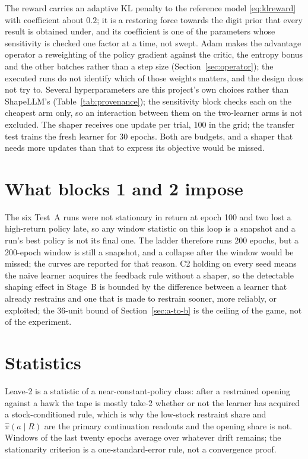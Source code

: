 The reward carries an adaptive KL penalty to the reference model
\eqref{eq:klreward} with coefficient about \(0.2\); it is a restoring
force towards the digit prior that every result is obtained under, and
its coefficient is one of the parameters whose sensitivity is checked
one factor at a time, not swept.
Adam makes the advantage operator a reweighting of the policy gradient
against the critic, the entropy bonus and the other batches rather than a
step size (Section~\ref{sec:operator}); the executed runs do not identify
which of those weights matters, and the design does not try to.
Several hyperparameters are this project's own choices rather than
ShapeLLM's (Table~\ref{tab:provenance}); the sensitivity block checks
each on the cheapest arm only, so an interaction between them on the
two-learner arms is not excluded.
The shaper receives one update per trial, 100 in the grid; the transfer
test trains the fresh learner for 30 epochs.
Both are budgets, and a shaper that needs more updates than that to
express its objective would be missed.

\section{What blocks 1 and 2 impose}

The six Test~A runs were not stationary in return at epoch 100 and two
lost a high-return policy late, so any window statistic on this loop is
a snapshot and a run's best policy is not its final one.
The ladder therefore runs 200 epochs, but a 200-epoch window is still a
snapshot, and a collapse after the window would be missed; the curves
are reported for that reason.
C2 holding on every seed means the naive learner acquires the feedback
rule without a shaper, so the detectable shaping effect in Stage~B is
bounded by the difference between a learner that already restrains and
one that is made to restrain sooner, more reliably, or exploited; the
36-unit bound of Section~\ref{sec:a-to-b} is the ceiling of the game,
not of the experiment.

\section{Statistics}

Leave-2 is a statistic of a near-constant-policy class: after a
restrained opening against a hawk the tape is mostly take-2 whether or
not the learner has acquired a stock-conditioned rule, which is why the
low-stock restraint share and \(\hat{\pi}(a\mid R)\) are the primary
continuation readouts and the opening share is not.
Windows of the last twenty epochs average over whatever drift remains;
the stationarity criterion is a one-standard-error rule, not a
convergence proof.

